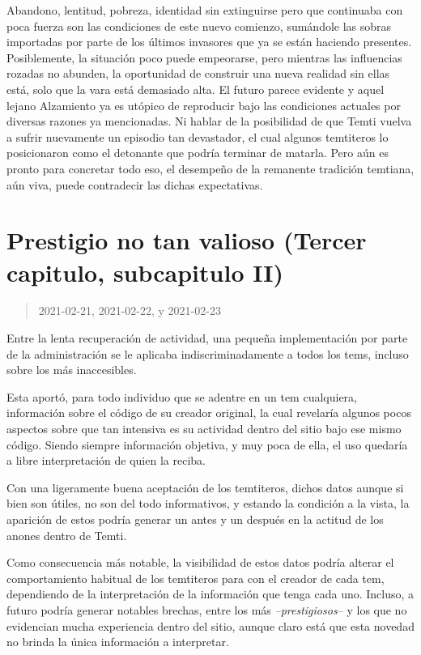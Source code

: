 \documentclass[
  spanish,
]{book}
\begin{document}
Abandono, lentitud, pobreza, identidad sin extinguirse pero que continuaba con poca fuerza son las condiciones de este nuevo comienzo, sumándole las sobras importadas por parte de los últimos invasores que ya se están haciendo presentes. Posiblemente, la situación poco puede empeorarse, pero mientras las influencias rozadas no abunden, la oportunidad de construir una nueva realidad sin ellas está, solo que la vara está demasiado alta. El futuro parece evidente y aquel lejano Alzamiento ya es utópico de reproducir bajo las condiciones actuales por diversas razones ya mencionadas. Ni hablar de la posibilidad de que Temti vuelva a sufrir nuevamente un episodio tan devastador, el cual algunos temtiteros lo posicionaron como el detonante que podría terminar de matarla. Pero aún es pronto para concretar todo eso, el desempeño de la remanente tradición temtiana, aún viva, puede contradecir las dichas expectativas.

\hypertarget{prestigio-no-tan-valioso-tercer-capitulo-subcapitulo-ii}{%
\section{Prestigio no tan valioso (Tercer capitulo, subcapitulo II)}\label{prestigio-no-tan-valioso-tercer-capitulo-subcapitulo-ii}}

\begin{quote}
2021-02-21, 2021-02-22, y 2021-02-23
\end{quote}

Entre la lenta recuperación de actividad, una pequeña implementación por parte de la administración se le aplicaba indiscriminadamente a todos los tems, incluso sobre los más inaccesibles.

Esta aportó, para todo individuo que se adentre en un tem cualquiera, información sobre el código de su creador original, la cual revelaría algunos pocos aspectos sobre que tan intensiva es su actividad dentro del sitio bajo ese mismo código. Siendo siempre información objetiva, y muy poca de ella, el uso quedaría a libre interpretación de quien la reciba.

Con una ligeramente buena aceptación de los temtiteros, dichos datos aunque si bien son útiles, no son del todo informativos, y estando la condición a la vista, la aparición de estos podría generar un antes y un después en la actitud de los anones dentro de Temti.

Como consecuencia más notable, la visibilidad de estos datos podría alterar el comportamiento habitual de los temtiteros para con el creador de cada tem, dependiendo de la interpretación de la información que tenga cada uno. Incluso, a futuro podría generar notables brechas, entre los más \emph{--prestigiosos--} y los que no evidencian mucha experiencia dentro del sitio, aunque claro está que esta novedad no brinda la única información a interpretar.
\end{document}
